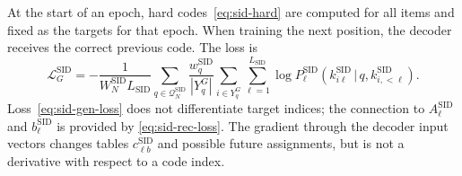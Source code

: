 \documentclass[12pt,a4paper]{article}
\newcommand{\given}{\,\vert\,}
\theoremstyle{plainru}
\begin{document}
At the start of an epoch, hard codes~\eqref{eq:sid-hard}
are computed for all items and fixed as the targets for that epoch.
When training the next position, the decoder receives the correct
previous code. The loss is
\begin{equation}\label{eq:sid-gen-loss}
 \mathcal L_G^{\mathrm{SID}}
 =-\frac{1}{W_N^{\mathrm{SID}}L_{\mathrm{SID}}}
 \sum_{q\in\mathcal Q_N^{\mathrm{SID}}}
 \frac{w_q^{\mathrm{SID}}}{|Y_q^G|}
 \sum_{i\in Y_q^G}\sum_{\ell=1}^{L_{\mathrm{SID}}}
 \log P_\ell^{\mathrm{SID}}
       (k_{i\ell}^{\mathrm{SID}}\given q,k_{i,<\ell}^{\mathrm{SID}}).
\end{equation}
Loss~\eqref{eq:sid-gen-loss} does not differentiate target indices;
the connection to $A_\ell^{\mathrm{SID}}$ and $b_\ell^{\mathrm{SID}}$ is provided by
\eqref{eq:sid-rec-loss}. The gradient through the decoder input vectors
changes tables $c_{\ell b}^{\mathrm{SID}}$ and possible future assignments,
but is not a derivative with respect to a code index.
\end{document}
